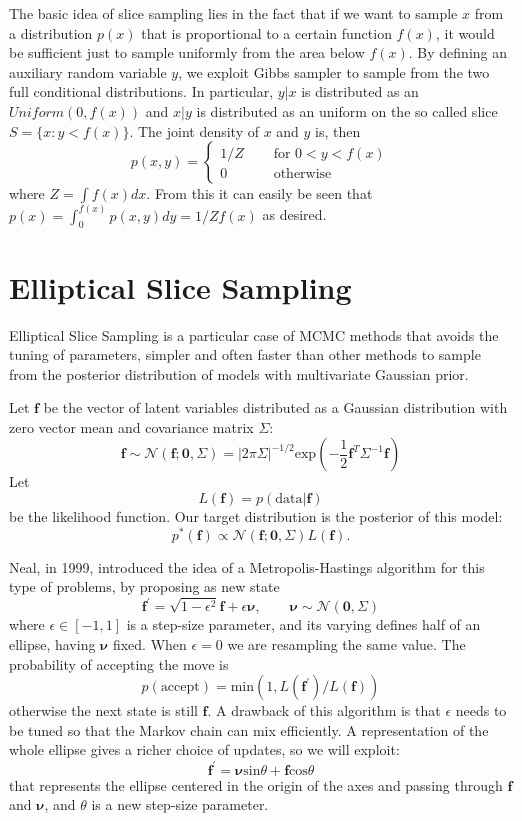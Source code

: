 \documentclass{article}
\begin{document}
The basic idea of slice sampling lies in the fact that if we want to sample $x$ from a distribution $p(x)$ that is proportional to a certain function $f(x)$, it would be sufficient just to sample uniformly from the area below $f(x)$.
By defining an auxiliary random variable $y$, we exploit Gibbs sampler to sample from the two full conditional distributions. In particular, $y|x$ is distributed as an $Uniform(0,f(x))$ and $x|y$ is distributed as an uniform on the so called slice $S=\lbrace x: y<f(x)\rbrace$. The joint density of $x$ and $y$ is, then $$p(x,y)=\begin{cases}1/Z\quad&\text{ for }0<y<f(x)\\0\quad&\text{ otherwise}\end{cases}$$where $Z=\int f(x)dx$. From this it can easily be seen that $p(x)=\int_0^{f(x)} p(x,y)dy=1/Zf(x)$ as desired. 

\section{Elliptical Slice Sampling}

Elliptical Slice Sampling is a particular case of MCMC methods that avoids the tuning of parameters, simpler and often faster than other methods to sample from the posterior distribution of models with multivariate Gaussian prior.

Let $\mathbf{f}$ be the vector of latent variables distributed as a Gaussian distribution with zero vector mean and covariance matrix $\Sigma$: $$\mathbf{f}\sim\mathcal{N}(\mathbf{f};\mathbf{0}, \Sigma)=|2\pi\Sigma|^{-1/2}\text{exp}\left(-\frac{1}{2}\mathbf{f}^T\Sigma^{-1}\mathbf{f}\right)$$ Let $$L(\mathbf{f})=p(\text{data}|\mathbf{f})$$ be the likelihood function. Our target distribution is the posterior of this model: $$p^*(\mathbf{f})\propto \mathcal{N}(\mathbf{f};\mathbf{0}, \Sigma)L(\mathbf{f}).$$

Neal, in 1999, introduced the idea of a Metropolis-Hastings algorithm for this type of problems, by proposing as new state 
$$\mathbf{f^{'}}=\sqrt{1-\epsilon^2}\mathbf{f}+\epsilon\pmb{\nu},\qquad\pmb{\nu}\sim\mathcal{N}(\mathbf{0}, \Sigma)$$ where $\epsilon\in[-1,1]$ is a step-size parameter, and its varying defines half of an ellipse, having $\pmb{\nu}$ fixed. When $\epsilon=0$ we are resampling the same value. The probability of accepting the move is $$p(\text{accept})=\text{min}(1,L(\mathbf{f^{'}})/L(\mathbf{f}))$$ otherwise the next state is still $\mathbf{f}$. A drawback of this algorithm is that $\epsilon$ needs to be tuned so that the Markov chain can mix efficiently. A representation of the whole ellipse gives a richer choice of updates, so we will exploit: $$\mathbf{f^{'}}=\pmb{\nu}\text{sin}\theta+\mathbf{f}\text{cos}\theta$$ that represents the ellipse centered in the origin of the axes and passing through $\mathbf{f}$ and $\pmb{\nu}$, and $\theta$ is a new step-size parameter.
\end{document}
